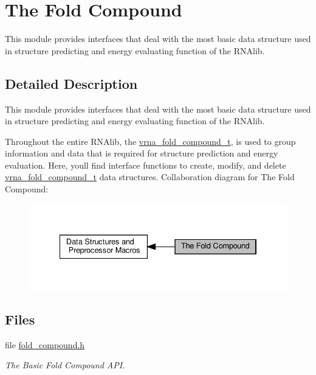 \hypertarget{group__fold__compound}{}\section{The Fold Compound}
\label{group__fold__compound}


This module provides interfaces that deal with the most basic data structure used in structure predicting and energy evaluating function of the R\+N\+Alib.  




\subsection{Detailed Description}
This module provides interfaces that deal with the most basic data structure used in structure predicting and energy evaluating function of the R\+N\+Alib. 

Throughout the entire R\+N\+Alib, the \hyperlink{group__fold__compound_ga1b0cef17fd40466cef5968eaeeff6166}{vrna\+\_\+fold\+\_\+compound\+\_\+t}, is used to group information and data that is required for structure prediction and energy evaluation. Here, you\textquotesingle{}ll find interface functions to create, modify, and delete \hyperlink{group__fold__compound_ga1b0cef17fd40466cef5968eaeeff6166}{vrna\+\_\+fold\+\_\+compound\+\_\+t} data structures. Collaboration diagram for The Fold Compound\+:
\nopagebreak
\begin{figure}[H]
\begin{center}
\leavevmode
\includegraphics[width=334pt]{group__fold__compound}
\end{center}
\end{figure}
\subsection*{Files}
\begin{DoxyCompactItemize}
\item 
file \hyperlink{fold__compound_8h}{fold\+\_\+compound.\+h}
\begin{DoxyCompactList}\small\item\em The Basic Fold Compound A\+PI. \end{DoxyCompactList}\end{DoxyCompactItemize}
